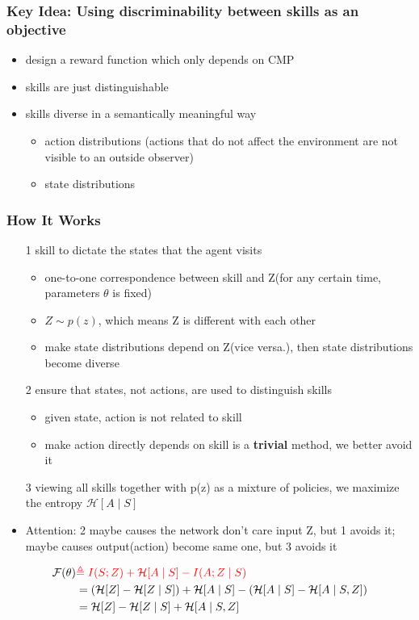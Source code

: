 \documentclass[aspectratio=169]{beamer}
\newcommand{\cmark}{\ding{51}}%
\newcommand{\xmark}{\ding{55}}%
\begin{document}
\begin{frame}
  \frametitle{Key Idea: Using discriminability between skills as an objective}
  \begin{itemize}
    \item design a reward function which only depends on CMP
    \item skills are just distinguishable \xmark
    \item skills diverse in a semantically meaningful way \cmark
    \begin{itemize}
      \item action distributions \xmark (actions that do not affect the environment are not visible to an outside observer)
      \item state distributions \cmark
    \end{itemize}
  \end{itemize}
\end{frame}

\begin{frame}
  \frametitle{How It Works}
  \begin{itemize}
    \item [1] skill to dictate the states that the agent visits
    \begin{itemize}
      \item one-to-one correspondence between skill and Z(for any certain time, parameters $\theta$ is fixed)
      \item $Z \sim p(z)$, which means Z is different with each other
      \item make state distributions depend on Z(vice versa.), then state distributions become diverse
    \end{itemize}
    \item [2] ensure that states, not actions, are used to distinguish skills
    \begin{itemize}
      \item given state, action is not related to skill
      \item make action directly depends on skill is a \textbf{trivial} method, we better avoid it
    \end{itemize}
    \item [3] viewing all skills together with p(z) as a mixture of policies, we maximize the entropy $\mathcal{H}[A \mid S]$
    \item Attention: \textcolor{NJUPurple}{2} maybe causes the network don't care input Z, but \textcolor{NJUPurple}{1} avoids it; maybe causes output(action) become same one, but \textcolor{NJUPurple}{3} avoids it
  \end{itemize}

  $$
  \begin{aligned}
  \mathcal{F}(\theta) & \textcolor{red}{\triangleq I(S ; Z)+\mathcal{H}[A \mid S]-I(A ; Z \mid S)} \\
  &=(\mathcal{H}[Z]-\mathcal{H}[Z \mid S])+\mathcal{H}[A \mid S]-(\mathcal{H}[A \mid S]-\mathcal{H}[A \mid S, Z]) \\
  &=\mathcal{H}[Z]-\mathcal{H}[Z \mid S]+\mathcal{H}[A \mid S, Z]
  \end{aligned}
  $$
\end{frame}
\end{document}
